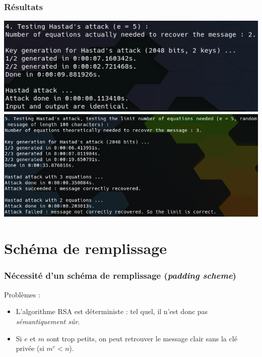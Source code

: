 \documentclass{beamer}
\newcommand{\Emph}{\textcolor{ff4500}}
\begin{document}
    \begin{frame} %
        \frametitle{Résultats}

        \includegraphics[scale=.55]{../screenshots/Hastad_2048.png}
        \includegraphics[scale=.5]{../screenshots/Hastad_test_limit_3.png}
    \end{frame}

    \section{Schéma de remplissage}
    \begin{frame}
        \frametitle{Nécessité d'un schéma de remplissage (\textit{padding scheme})}

        \begin{block}{Problèmes :}
            \begin{itemize}
                \item<1-> L'algorithme RSA est \Emph{déterministe} : tel quel, il n'est donc pas \emph{sémantiquement sûr}.
                
                \item<2-> Si $e$ et $m$ sont trop petits, on peut retrouver le message clair sans la clé privée (si $m^e < n$).
            \end{itemize}
        \end{block}

    \end{frame}
\end{document}
